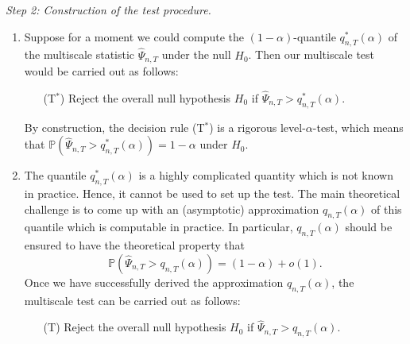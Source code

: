 \documentclass[a4paper,12pt]{article}
\begin{document}
\noindent \textit{Step 2: Construction of the test procedure.}
\begin{enumerate}[label=(\roman*),leftmargin=0.75cm]

\item Suppose for a moment we could compute the $(1-\alpha)$-quantile $q_{n,T}^*(\alpha)$ of the multiscale statistic $\hat{\Psi}_{n,T}$ under the null $H_0$. Then our multiscale test would be carried out as follows: 
\begin{itemize}[leftmargin=1cm]

\item[(T$^*$)] Reject the overall null hypothesis $H_0$ if $\hat{\Psi}_{n,T} > q_{n,T}^*(\alpha)$. 
\end{itemize}
By construction, the decision rule (T$^*$) is a rigorous level-$\alpha$-test, which means that $\mathbb{P}(\hat{\Psi}_{n,T} > q_{n,T}^*(\alpha)) = 1-\alpha$ under $H_0$. 
\item The quantile $q_{n,T}^*(\alpha)$ is a highly complicated quantity which is not known in practice. Hence, it cannot be used to set up the test. The main theoretical challenge is to come up with an (asymptotic) approximation $q_{n,T}(\alpha)$ of this quantile which is computable in practice. In particular, $q_{n,T}(\alpha)$ should be ensured to have the theoretical property that 
\[ \mathbb{P} (\hat{\Psi}_{n,T} > q_{n,T}(\alpha)) = (1-\alpha) + o(1). \]
Once we have successfully derived the approximation $q_{n,T}(\alpha)$, the multiscale test can be carried out as follows: 
\begin{itemize}[leftmargin=0.8cm]
\item[(T)] Reject the overall null hypothesis $H_0$ if $\hat{\Psi}_{n,T} > q_{n,T}(\alpha)$. 
\end{itemize}


\end{enumerate}
\end{document}
